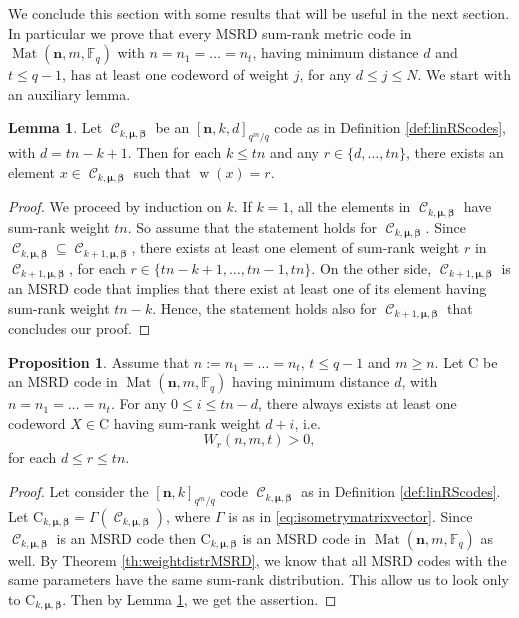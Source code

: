 \documentclass[11pt]{amsart}
\DeclareMathOperator{\C}{\mathcal{C}}
\DeclareMathOperator{\Mat}{Mat}
\DeclareMathOperator{\ww}{w}
\theoremstyle{definition}
\newtheorem{lemma}[theorem]{Lemma}
\newtheorem{proposition}[theorem]{Proposition}
\newcommand{\F}{{\mathbb F}}
\newcommand{\muu}{{\boldsymbol{\mu}}}
\newcommand{\bfn}{\mathbf {n}}
\newcommand{\Fmnk}{[\bfn,k]_{q^m/q}}
\newcommand{\Fmnkd}{[\bfn,k,d]_{q^m/q}}
\begin{document}
We conclude this section with some results that will be useful in the next section. In particular we prove that every MSRD sum-rank metric code in $\Mat(\bfn,m,\F_q)$ with $n=n_1=\ldots=n_t$, having minimum distance $d$ and $t\leq q-1$, has at least one codeword of weight $j$, for any $d \leq j \leq N$. We start with an auxiliary lemma.
 
\begin{lemma} \label{lem:weightdistrreedsolomon}
    Let $\C_{k,\muu,\boldsymbol{\beta}}$ be an $\Fmnkd$ code as in Definition \ref{def:linRScodes}, with $d=tn-k+1$. Then for each $k \leq tn$ and any $r \in \{d,\ldots,tn\}$, there exists an element $x \in \C_{k,\muu,\boldsymbol{\beta}}$ such that
$ \ww(x)=r$.
\end{lemma}

\begin{proof}
     We proceed by induction on $k$. If $k=1$, all the elements in $\C_{k,\muu,\boldsymbol{\beta}}$ have sum-rank weight $tn$. So assume that the statement holds for $\C_{k,\muu,\boldsymbol{\beta}}$. Since $\C_{k,\muu,\boldsymbol{\beta}} \subseteq \C_{k+1,\muu,\boldsymbol{\beta}}$, there exists at least one element of sum-rank weight $r$ in $\C_{k+1,\muu,\boldsymbol{\beta}}$, for each $r \in \{tn-k+1,\ldots,tn-1,tn\}$. On the other side, $\C_{k+1,\muu,\boldsymbol{\beta}}$ is an MSRD code that implies that there exist at least one of its element having sum-rank weight $tn-k$. Hence, the statement holds also for $\C_{k+1,\muu,\boldsymbol{\beta}}$ that concludes our proof.
\end{proof}

\begin{proposition} \label{prop:numberweightMSRD}
    Assume that $n:=n_1=\ldots=n_t$, $t\leq q-1$ and $m \geq n$. Let $\mathrm{C}$ be an MSRD code in $\Mat(\bfn,m,\F_q)$ having minimum distance $d$, with $n=n_1=\ldots=n_t$.  For any $0 \leq i \leq tn-d$, there always exists at least one codeword $X \in \mathrm{C}$ having sum-rank weight $d+i$, i.e.
    \[
    W_r(n,m,t)>0,
    \]
    for each $d \leq r \leq tn$.  
\end{proposition}
\begin{proof}
Let consider the $\Fmnk$ code $\C_{k,\muu,\boldsymbol{\beta}}$ as in Definition \ref{def:linRScodes}. Let $\mathrm{C}_{k,\muu,\boldsymbol{\beta}}= \Gamma(\C_{k,\muu,\boldsymbol{\beta}})$, where $\Gamma$ is as in \eqref{eq:isometrymatrixvector}. Since $\C_{k,\muu,\boldsymbol{\beta}}$ is an MSRD code then $\mathrm{C}_{k,\muu,\boldsymbol{\beta}}$ is an MSRD code in $\Mat(\bfn,m,\F_q)$ as well. By Theorem \ref{th:weightdistrMSRD}, we know that all MSRD codes with the same parameters have the same sum-rank distribution. This allow us to look only to $\mathrm{C}_{k,\muu,\boldsymbol{\beta}}$. Then by Lemma \ref{lem:weightdistrreedsolomon}, we get the assertion.
\end{proof}
\end{document}
